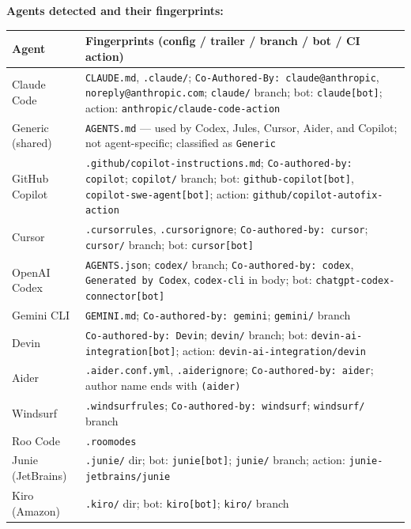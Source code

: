 \documentclass[9pt,a4paper]{article}
\begin{document}
\vspace{5pt}
\noindent\textbf{Agents detected and their fingerprints:}

\begin{tabular}{@{}lp{13.5cm}@{}}
\toprule
Agent & Fingerprints (config / trailer / branch / bot / CI action) \\
\midrule
Claude Code &
  \texttt{CLAUDE.md}, \texttt{.claude/};
  \texttt{Co-Authored-By: claude@anthropic}, \texttt{noreply@anthropic.com};
  \texttt{claude/} branch; bot: \texttt{claude[bot]};
  action: \texttt{anthropic/claude-code-action} \\[2pt]
Generic (shared) &
  \texttt{AGENTS.md} --- used by Codex, Jules, Cursor, Aider, and Copilot;
  not agent-specific; classified as \texttt{Generic} \\[2pt]
GitHub Copilot &
  \texttt{.github/copilot-instructions.md};
  \texttt{Co-authored-by: copilot}; \texttt{copilot/} branch;
  bot: \texttt{github-copilot[bot]}, \texttt{copilot-swe-agent[bot]};
  action: \texttt{github/copilot-autofix-action} \\[2pt]
Cursor &
  \texttt{.cursorrules}, \texttt{.cursorignore};
  \texttt{Co-authored-by: cursor}; \texttt{cursor/} branch; bot: \texttt{cursor[bot]} \\[2pt]
OpenAI Codex &
  \texttt{AGENTS.json}; \texttt{codex/} branch;
  \texttt{Co-authored-by: codex}, \texttt{Generated by Codex}, \texttt{codex-cli} in body;
  bot: \texttt{chatgpt-codex-connector[bot]} \\[2pt]
Gemini CLI &
  \texttt{GEMINI.md};
  \texttt{Co-authored-by: gemini}; \texttt{gemini/} branch \\[2pt]
Devin &
  \texttt{Co-authored-by: Devin}; \texttt{devin/} branch;
  bot: \texttt{devin-ai-integration[bot]};
  action: \texttt{devin-ai-integration/devin} \\[2pt]
Aider &
  \texttt{.aider.conf.yml}, \texttt{.aiderignore};
  \texttt{Co-authored-by: aider};
  author name ends with \texttt{(aider)} \\[2pt]
Windsurf &
  \texttt{.windsurfrules};
  \texttt{Co-authored-by: windsurf}; \texttt{windsurf/} branch \\[2pt]
Roo Code &
  \texttt{.roomodes} \\[2pt]
Junie (JetBrains) &
  \texttt{.junie/} dir; bot: \texttt{junie[bot]}; \texttt{junie/} branch;
  action: \texttt{junie-jetbrains/junie} \\[2pt]
Kiro (Amazon) &
  \texttt{.kiro/} dir; bot: \texttt{kiro[bot]}; \texttt{kiro/} branch \\[2pt]

\end{tabular}
\end{document}
